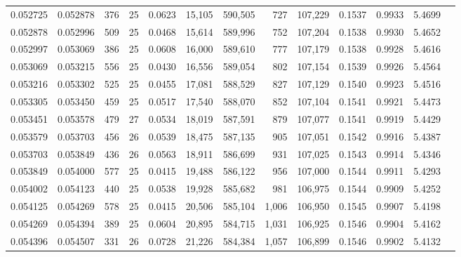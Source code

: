\begin{tabular}{rrrrrrrrrrrrr}
0.052725 & 0.052878 & 376 &  25 &                                     0.0623 &  15,105 & 590,505 &     727 & 107,229 & 0.1537 & 0.9933 & 5.4699 \\
0.052878 & 0.052996 & 509 &  25 &                                     0.0468 &  15,614 & 589,996 &     752 & 107,204 & 0.1538 & 0.9930 & 5.4652 \\
0.052997 & 0.053069 & 386 &  25 &                                     0.0608 &  16,000 & 589,610 &     777 & 107,179 & 0.1538 & 0.9928 & 5.4616 \\
0.053069 & 0.053215 & 556 &  25 &                                     0.0430 &  16,556 & 589,054 &     802 & 107,154 & 0.1539 & 0.9926 & 5.4564 \\
0.053216 & 0.053302 & 525 &  25 &                                     0.0455 &  17,081 & 588,529 &     827 & 107,129 & 0.1540 & 0.9923 & 5.4516 \\
0.053305 & 0.053450 & 459 &  25 &                                     0.0517 &  17,540 & 588,070 &     852 & 107,104 & 0.1541 & 0.9921 & 5.4473 \\
0.053451 & 0.053578 & 479 &  27 &                                     0.0534 &  18,019 & 587,591 &     879 & 107,077 & 0.1541 & 0.9919 & 5.4429 \\
0.053579 & 0.053703 & 456 &  26 &                                     0.0539 &  18,475 & 587,135 &     905 & 107,051 & 0.1542 & 0.9916 & 5.4387 \\
0.053703 & 0.053849 & 436 &  26 &                                     0.0563 &  18,911 & 586,699 &     931 & 107,025 & 0.1543 & 0.9914 & 5.4346 \\
0.053849 & 0.054000 & 577 &  25 &                                     0.0415 &  19,488 & 586,122 &     956 & 107,000 & 0.1544 & 0.9911 & 5.4293 \\
0.054002 & 0.054123 & 440 &  25 &                                     0.0538 &  19,928 & 585,682 &     981 & 106,975 & 0.1544 & 0.9909 & 5.4252 \\
0.054125 & 0.054269 & 578 &  25 &                                     0.0415 &  20,506 & 585,104 &   1,006 & 106,950 & 0.1545 & 0.9907 & 5.4198 \\
0.054269 & 0.054394 & 389 &  25 &                                     0.0604 &  20,895 & 584,715 &   1,031 & 106,925 & 0.1546 & 0.9904 & 5.4162 \\
0.054396 & 0.054507 & 331 &  26 &                                     0.0728 &  21,226 & 584,384 &   1,057 & 106,899 & 0.1546 & 0.9902 & 5.4132 \\

\end{tabular}
